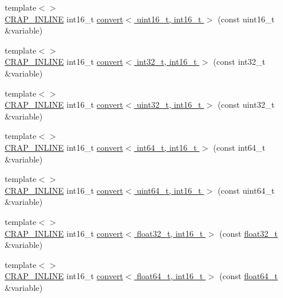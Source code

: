\begin{DoxyCompactItemize}
\item 
{\footnotesize template$<$$>$ }\\\hyperlink{config__x86_8h_a5a40526b8d842e7ff731509998bb0f1c}{C\+R\+A\+P\+\_\+\+I\+N\+L\+I\+N\+E} int16\+\_\+t \hyperlink{namespacecrap_a2ff21dbacf45a7c74acccb8b5a4f4e82}{convert$<$ uint16\+\_\+t, int16\+\_\+t $>$} (const uint16\+\_\+t \&variable)
\item 
{\footnotesize template$<$$>$ }\\\hyperlink{config__x86_8h_a5a40526b8d842e7ff731509998bb0f1c}{C\+R\+A\+P\+\_\+\+I\+N\+L\+I\+N\+E} int16\+\_\+t \hyperlink{namespacecrap_a12c0482101fcf69cc2c08ff7ea4def09}{convert$<$ int32\+\_\+t, int16\+\_\+t $>$} (const int32\+\_\+t \&variable)
\item 
{\footnotesize template$<$$>$ }\\\hyperlink{config__x86_8h_a5a40526b8d842e7ff731509998bb0f1c}{C\+R\+A\+P\+\_\+\+I\+N\+L\+I\+N\+E} int16\+\_\+t \hyperlink{namespacecrap_a97c7e2b5d83d96a3bec0dd8731efe1db}{convert$<$ uint32\+\_\+t, int16\+\_\+t $>$} (const uint32\+\_\+t \&variable)
\item 
{\footnotesize template$<$$>$ }\\\hyperlink{config__x86_8h_a5a40526b8d842e7ff731509998bb0f1c}{C\+R\+A\+P\+\_\+\+I\+N\+L\+I\+N\+E} int16\+\_\+t \hyperlink{namespacecrap_ab3e1f6d24576fc674876a8f01b927a38}{convert$<$ int64\+\_\+t, int16\+\_\+t $>$} (const int64\+\_\+t \&variable)
\item 
{\footnotesize template$<$$>$ }\\\hyperlink{config__x86_8h_a5a40526b8d842e7ff731509998bb0f1c}{C\+R\+A\+P\+\_\+\+I\+N\+L\+I\+N\+E} int16\+\_\+t \hyperlink{namespacecrap_a02b0d31900213a4f454dbe387eb09c9d}{convert$<$ uint64\+\_\+t, int16\+\_\+t $>$} (const uint64\+\_\+t \&variable)
\item 
{\footnotesize template$<$$>$ }\\\hyperlink{config__x86_8h_a5a40526b8d842e7ff731509998bb0f1c}{C\+R\+A\+P\+\_\+\+I\+N\+L\+I\+N\+E} int16\+\_\+t \hyperlink{namespacecrap_a4ffb2cfbad8923e9f3a6a51dbe14d419}{convert$<$ float32\+\_\+t, int16\+\_\+t $>$} (const \hyperlink{crap__types_8h_a4611b605e45ab401f02cab15c5e38715}{float32\+\_\+t} \&variable)
\item 
{\footnotesize template$<$$>$ }\\\hyperlink{config__x86_8h_a5a40526b8d842e7ff731509998bb0f1c}{C\+R\+A\+P\+\_\+\+I\+N\+L\+I\+N\+E} int16\+\_\+t \hyperlink{namespacecrap_a3c066eb962b08c6804e02cfb1b4e92a2}{convert$<$ float64\+\_\+t, int16\+\_\+t $>$} (const \hyperlink{crap__types_8h_ac55f3ae81b5bc9053760baacf57e47f4}{float64\+\_\+t} \&variable)

\end{DoxyCompactItemize}
